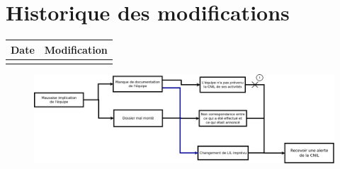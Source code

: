 \documentclass[11pt]{article}
\begin{document}
\section*{Historique des modifications}
\begin{table}[H]
\centering
	\begin{tabularx}{12.8cm}{|X|X|}
	\hline
	Date & Modification \\
	\hline
	  & \\
	\hline
	\end{tabularx}
\end{table}
\newpage


\begin{figure}
	\centering
	\includegraphics[scale=0.35]{../images/AnalyseRisque_nPourquoi_FDR010.png}
\end{figure}
\end{document}
